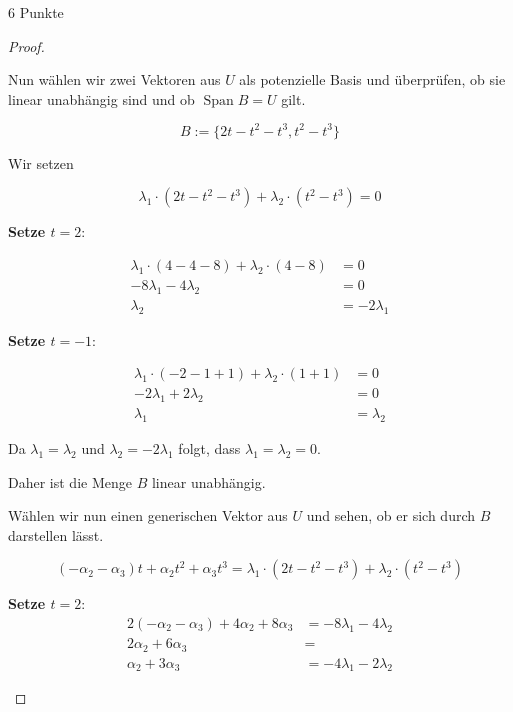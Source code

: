 \documentclass{problemset}
\begin{document}
\begin{problem}{6 Punkte}
\begin{proof}
\begin{enumerate}
		      Nun wählen wir zwei Vektoren aus $U$ als potenzielle Basis und überprüfen, ob sie linear unabhängig sind und ob $\operatorname{Span} B = U$ gilt.

		      \[
			      B := \{2t - t^2 - t^3, t^2 - t^3\}
		      \]

		      Wir setzen

		      \[
			      \lambda_1 \cdot (2t - t^2 - t^3) + \lambda_2 \cdot (t^2 - t^3) = 0
		      \]

		      \textbf{Setze $t = 2$}:

		      \begin{align*}
			      \lambda_1 \cdot (4 - 4 - 8) + \lambda_2 \cdot (4 - 8) & = 0            \\
			      -8 \lambda_1 - 4 \lambda_2                            & = 0            \\
			      \lambda_2                                             & = -2 \lambda_1
		      \end{align*}

		      \textbf{Setze $t = -1$}:

		      \begin{align*}
			      \lambda_1 \cdot (-2 - 1 + 1) + \lambda_2 \cdot (1 + 1) & = 0         \\
			      -2 \lambda_1 + 2 \lambda_2                             & = 0         \\
			      \lambda_1                                              & = \lambda_2
		      \end{align*}

		      Da $\lambda_1 = \lambda_2$ und $\lambda_2 = -2 \lambda_1$ folgt, dass $\lambda_1 = \lambda_2 = 0$.

		      Daher ist die Menge $B$ linear unabhängig.

		      Wählen wir nun einen generischen Vektor aus $U$ und sehen, ob er sich durch $B$ darstellen lässt.

		      \[
			      (-\alpha_2 - \alpha_3)t + \alpha_2t^2 + \alpha_3t^3 = \lambda_1 \cdot (2t - t^2 - t^3) + \lambda_2 \cdot (t^2 - t^3)
		      \]

		      \textbf{Setze $t = 2$}:
		      \begin{align*}
			      2(-\alpha_2 - \alpha_3) + 4\alpha_2 + 8\alpha_3 & = -8 \lambda_1 - 4 \lambda_2 \\
			      2\alpha_2 + 6\alpha_3                           & =                            \\
			      \alpha_2 + 3\alpha_3                            & = -4 \lambda_1 - 2 \lambda_2
		      \end{align*}


\end{enumerate}
\end{proof}
\end{problem}
\end{document}
